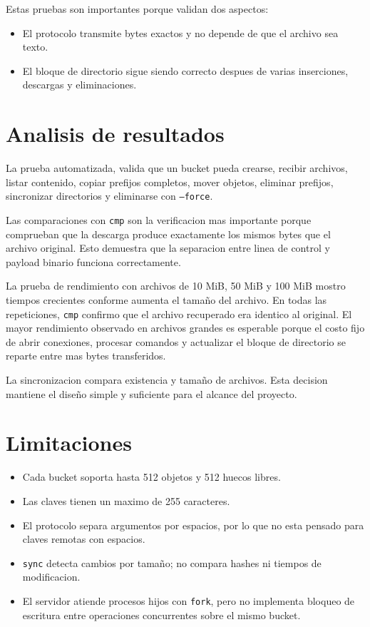 \documentclass[12pt,letterpaper]{article}
\begin{document}
Estas pruebas son importantes porque validan dos aspectos:
\begin{itemize}
    \item El protocolo transmite bytes exactos y no depende de que el archivo sea texto.
    \item El bloque de directorio sigue siendo correcto despues de varias inserciones,
    descargas y eliminaciones.
\end{itemize}

\section{Analisis de resultados}

La prueba automatizada, valida que
un bucket pueda crearse, recibir archivos, listar contenido, copiar prefijos completos,
mover objetos, eliminar prefijos, sincronizar directorios y eliminarse con
\texttt{--force}.

Las comparaciones con \texttt{cmp} son la verificacion mas importante porque comprueban
que la descarga produce exactamente los mismos bytes que el archivo original. Esto
demuestra que la separacion entre linea de control y payload binario funciona
correctamente.

La prueba de rendimiento con archivos de 10 MiB, 50 MiB y 100 MiB mostro tiempos
crecientes conforme aumenta el tama\~{n}o del archivo. En todas las repeticiones,
\texttt{cmp} confirmo que el archivo recuperado era identico al original. El mayor
rendimiento observado en archivos grandes es esperable porque el costo fijo de abrir
conexiones, procesar comandos y actualizar el bloque de directorio se reparte entre
mas bytes transferidos.

La sincronizacion compara existencia y tama\~{n}o de archivos. Esta decision mantiene
el dise\~{n}o simple y suficiente para el alcance del proyecto.

\section{Limitaciones}

\begin{itemize}
    \item Cada bucket soporta hasta 512 objetos y 512 huecos libres.
    \item Las claves tienen un maximo de 255 caracteres.
    \item El protocolo separa argumentos por espacios, por lo que no esta pensado para
    claves remotas con espacios.
    \item \texttt{sync} detecta cambios por tama\~{n}o; no compara hashes ni tiempos de
    modificacion.
    \item El servidor atiende procesos hijos con \texttt{fork}, pero no implementa
    bloqueo de escritura entre operaciones concurrentes sobre el mismo bucket.
\end{itemize}
\end{document}
